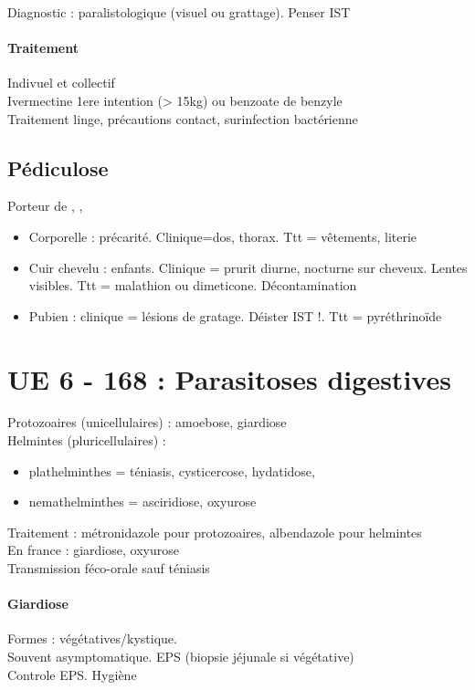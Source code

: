 \documentclass{article}
\begin{document}
Diagnostic : paralistologique (visuel ou grattage). Penser IST

\paragraph{Traitement} 
Indivuel et collectif\\
Ivermectine 1ere intention (> 15kg) ou benzoate de benzyle\\
Traitement linge, précautions contact, surinfection bactérienne

\subsection{Pédiculose}
Porteur de , , 

\begin{itemize}
  \item Corporelle : précarité. Clinique=dos, thorax. Ttt = vêtements, literie
    \item Cuir chevelu : enfants. Clinique = prurit diurne, nocturne sur
      cheveux. Lentes visibles. Ttt = malathion ou dimeticone. Décontamination
      \item Pubien : clinique = lésions de gratage. Déister IST !. Ttt = pyréthrinoïde
\end{itemize}

\section{UE 6 - 168 : Parasitoses digestives}
Protozoaires (unicellulaires) : amoebose, giardiose\\
Helmintes (pluricellulaires) : 
\begin{itemize}
  \item plathelminthes = téniasis, cysticercose, hydatidose, 
  \item nemathelminthes = asciridiose, oxyurose
\end{itemize}
Traitement : métronidazole pour protozoaires, albendazole pour helmintes\\
En france : giardiose, oxyurose\\
Transmission féco-orale sauf téniasis

\paragraph{Giardiose} Formes : végétatives/kystique. \\
Souvent asymptomatique. EPS (biopsie jéjunale si végétative)\\
Controle EPS. Hygiène
\end{document}
